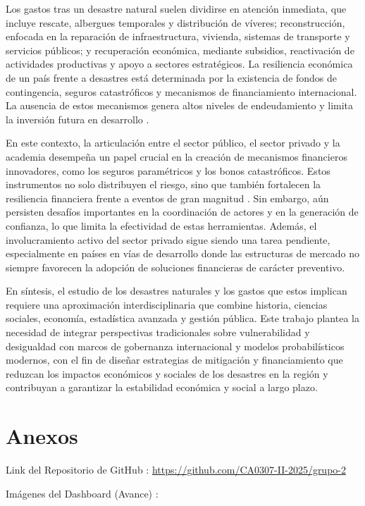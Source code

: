 \documentclass[12pt, a4paper]{article}
\begin{document}
Los gastos tras un desastre natural suelen dividirse en atención inmediata, que incluye rescate, albergues temporales y distribución de víveres; reconstrucción, enfocada en la reparación de infraestructura, vivienda, sistemas de transporte y servicios públicos; y recuperación económica, mediante subsidios, reactivación de actividades productivas y apoyo a sectores estratégicos. La resiliencia económica de un país frente a desastres está determinada por la existencia de fondos de contingencia, seguros catastróficos y mecanismos de financiamiento internacional. La ausencia de estos mecanismos genera altos niveles de endeudamiento y limita la inversión futura en desarrollo \cite{CentenoMorales2017,OrozcoMontoya2022}.

En este contexto, la articulación entre el sector público, el sector privado y la academia desempeña un papel crucial en la creación de mecanismos financieros innovadores, como los seguros paramétricos y los bonos catastróficos. Estos instrumentos no solo distribuyen el riesgo, sino que también fortalecen la resiliencia financiera frente a eventos de gran magnitud \cite{quesada2020}. Sin embargo, aún persisten desafíos importantes en la coordinación de actores y en la generación de confianza, lo que limita la efectividad de estas herramientas. Además, el involucramiento activo del sector privado sigue siendo una tarea pendiente, especialmente en países en vías de desarrollo donde las estructuras de mercado no siempre favorecen la adopción de soluciones financieras de carácter preventivo.

En síntesis, el estudio de los desastres naturales y los gastos que estos implican requiere una aproximación interdisciplinaria que combine historia, ciencias sociales, economía, estadística avanzada y gestión pública. Este trabajo plantea la necesidad de integrar perspectivas tradicionales sobre vulnerabilidad y desigualdad con marcos de gobernanza internacional y modelos probabilísticos modernos, con el fin de diseñar estrategias de mitigación y financiamiento que reduzcan los impactos económicos y sociales de los desastres en la región y contribuyan a garantizar la estabilidad económica y social a largo plazo.


\newpage
\section*{Anexos}
Link del Repositorio de GitHub : \url{https://github.com/CA0307-II-2025/grupo-2}

Imágenes del Dashboard (Avance) :
\end{document}

